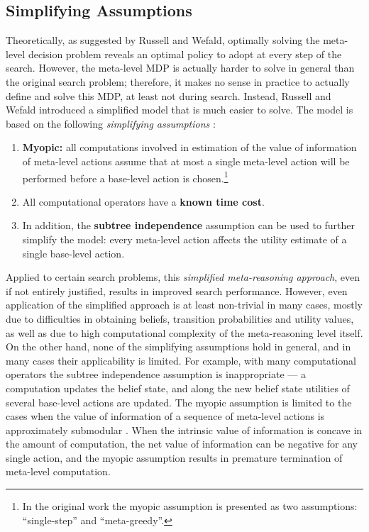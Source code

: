 \subsection{Simplifying Assumptions}
\label{sec:ratimeta-assumptions}

Theoretically, as suggested by Russell and Wefald, optimally solving
the meta-level decision problem reveals an optimal policy to adopt at
every step of the search. However, the meta-level MDP is actually
harder to solve in general than the original search problem;
therefore, it makes no sense in practice to actually define and solve 
this MDP, at least not during search. Instead, Russell and Wefald
introduced a simplified model that is much easier to solve. The model
is based on the following \emph{simplifying
assumptions} \cite{Russell.right}: 
\begin{enumerate}
\item \textbf{Myopic:} all computations involved in estimation of the
value of information of meta-level actions assume that at most a single
meta-level action will be performed before a base-level action is
chosen.\footnote{In the original work \cite{Russell.right} the myopic
assumption is presented as two assumptions: ``single-step'' and
``meta-greedy''.}
\item All computational operators have a \textbf{known time cost}.
\item In addition, the \textbf{subtree independence} assumption can
be used to further simplify the model: every meta-level action
affects the utility estimate of a single base-level action. 
\end{enumerate}
Applied to certain search problems, this \emph{simplified
meta-reasoning approach}, even if not entirely justified, results in
improved search performance. However, even application of the
simplified approach is at least non-trivial in many cases, mostly due
to difficulties in obtaining beliefs, transition probabilities and
utility values, as well as due to high computational complexity of the
meta-reasoning level itself. On the other hand, none of the simplifying
assumptions hold in general, and in many cases their applicability is
limited. For example, with many computational operators the subtree
independence assumption is inappropriate --- a computation updates
the belief state, and along the new belief state utilities of several
base-level actions are updated. The myopic assumption is limited to
the cases when the value of information of a sequence of meta-level
actions is approximately submodular \cite{Guestrin.submodular}. When 
the intrinsic value of information is concave in the amount of
computation, the net value of information can be negative for any
single action, and the myopic assumption results in premature
termination of meta-level computation. 
